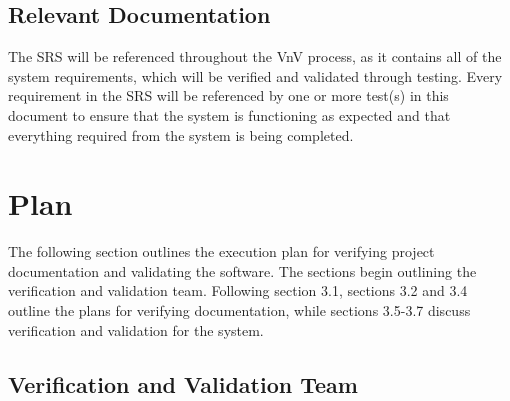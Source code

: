 \documentclass[12pt, titlepage]{article}
\begin{document}
\subsection{Relevant Documentation}


\cite{SRS}


The SRS will be referenced throughout the VnV process, as it contains all of the system requirements, which will be verified and validated through testing. Every requirement in the SRS will be referenced by one or more test(s) in this document to ensure that the system is functioning as expected and that everything required from the system is being completed.

\section{Plan}
\label{section:JustPlan}

The following section outlines the execution plan for verifying project documentation and validating the software. The sections begin outlining the verification and validation team. Following section 3.1, sections 3.2 and 3.4 outline the plans for verifying documentation, while sections 3.5-3.7 discuss verification and validation for the system.

\subsection{Verification and Validation Team}
\end{document}
